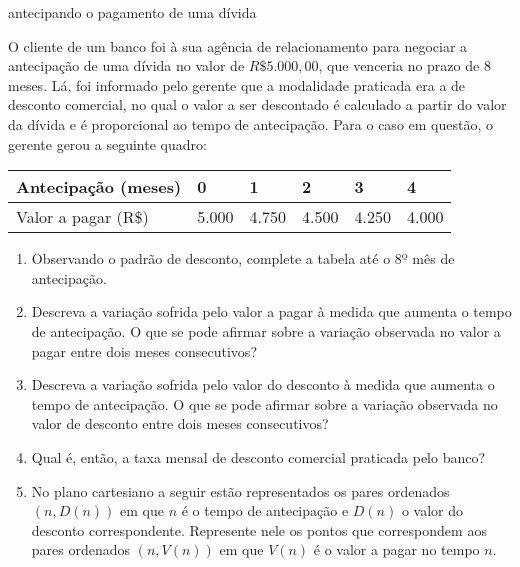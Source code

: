 \practice{ }
\label{\detokenize{AF107-6::doc}}\label{\detokenize{AF107-6:praticando}}

\begin{task}{antecipando o pagamento de uma dívida}
\label{\detokenize{AF107-6:atividade-antecipando-o-pagamento-de-uma-divida}}\label{\detokenize{AF107-6:ativ-titulo-da-atividade}}


O cliente de um banco foi à sua agência de relacionamento para negociar a antecipação de uma dívida no valor de \(R\$ 5.000,00\), que venceria no prazo de 8 meses. Lá, foi informado pelo gerente que a modalidade praticada era a de desconto comercial, no qual o valor a ser descontado é calculado a partir do valor da dívida e é proporcional ao tempo de antecipação. Para o caso em questão, o gerente gerou a seguinte quadro:


\begin{savenotes}\sphinxattablestart
\centering
\begin{tabulary}{\linewidth}[t]{|T|T|T|T|T|T|}
\hline

Antecipação (meses)
&
0
&
1
&
2
&
3
&
4
\\
\hline
Valor a pagar (R\$)
&
5.000
&
4.750
&
4.500
&
4.250
&
4.000
\\
\hline
\end{tabulary}
\par
\sphinxattableend\end{savenotes}
\begin{enumerate}
\item {} 
Observando o padrão de desconto, complete a tabela até o 8º mês de antecipação.

\item {} 
Descreva a variação sofrida pelo valor a pagar à medida que aumenta o tempo de antecipação. O que se pode afirmar sobre a variação observada no valor a pagar entre dois meses consecutivos?

\item {} 
Descreva a variação sofrida pelo valor do desconto à medida que aumenta o tempo de antecipação. O que se pode afirmar sobre a variação observada no valor de desconto entre dois meses consecutivos?

\item {} 
Qual é, então, a taxa mensal de desconto comercial praticada pelo banco?

\item {} 
No plano cartesiano a seguir estão representados os pares ordenados \((n,D(n))\) em que \(n\) é o tempo de antecipação e \(D(n)\) o valor do desconto correspondente. Represente nele os pontos que correspondem aos pares ordenados \((n,V(n))\) em que \(V(n)\) é o valor a pagar no tempo \(n\).


\end{enumerate}
\end{task}
